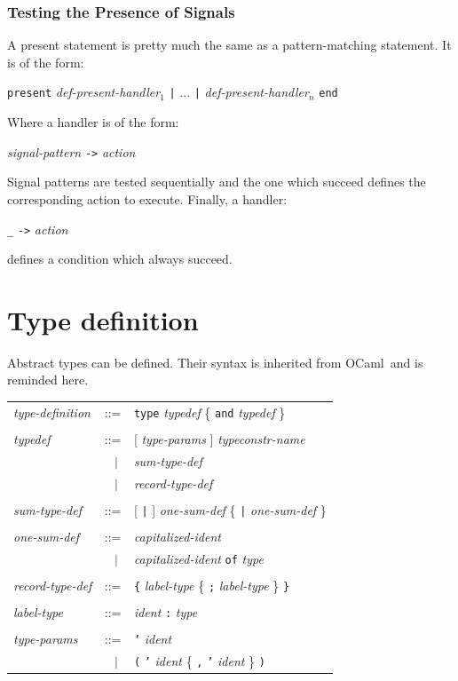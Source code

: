 \documentclass[11pt,titlepage,twoside]{report}
\newcommand{\ocaml}{{\sf OCaml}}
\newcommand{\alt}{\;|\;}
\newcommand{\term}[1]{{\tt #1}}
\newcommand{\nterm}[1]{{\em #1}}
\begin{document}
\subsubsection{Testing the Presence of Signals}
A present statement is pretty much the same as a pattern-matching
statement. It is of the form: 
\begin{center}
  \term{present} \nterm{def-present-handler}$_1$ 
  \term{|} ... \term{|} \nterm{def-present-handler}$_n$ \term{end}
\end{center}
Where a handler is of the form:
\begin{center}
  \nterm{signal-pattern} \term{->} \nterm{action}
\end{center}
Signal patterns are tested sequentially and the one which succeed
defines the corresponding action to execute. Finally, a handler:
\begin{center} 
  \term{\_} \term{->} \nterm{action}
\end{center}
defines a condition which always succeed.

\section{Type definition}
Abstract types can be defined. Their syntax is inherited from \ocaml\
and is reminded here. 
\begin{center}
\begin{tabular}{lcl}
\nterm{type-definition} 
  & ::=    & \term{type} \nterm{typedef} 
             \{ \term{and} \nterm{typedef} \} 
\\ \\
\nterm{typedef}
  & ::=        & [ \nterm{type-params} ] \nterm{typeconstr-name} \\
  & $\;\;\alt$ & \nterm{sum-type-def} \\
  & $\;\;\alt$ & \nterm{record-type-def} 
\\ \\
\nterm{sum-type-def}
  & ::=        & [ \term{|} ] \nterm{one-sum-def} 
                 \{ \term{|} \nterm{one-sum-def} \} 
\\ \\
\nterm{one-sum-def}     
  & ::=        & \nterm{capitalized-ident} \\
  & $\;\;\alt$ & \nterm{capitalized-ident} \term{of} \nterm{type} 
\\ \\
\nterm{record-type-def} 
  & ::=        & \term{\{} \nterm{label-type}
                 \{ \term{;} \nterm{label-type} \} \term{\}} 
\\ \\
\nterm{label-type}
  & ::=        & \nterm{ident} \term{:} \nterm{type} 
\\ \\
\nterm{type-params}
  & ::=        & \term{'} \nterm{ident} \\
  & $\;\;\alt$ & \term{(} \term{'} \nterm{ident} 
                 \{ \term{,} \term{'} \nterm{ident} \} \term{)}
\end{tabular}
\end{center}
\end{document}

